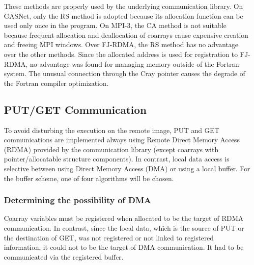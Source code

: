 These methods are properly used by the underlying communication library.
%
On GASNet, only the RS method is adopted because its allocation function
can be used only once in the program.
%
On MPI-3, the CA method is not suitable because frequent 
allocation and deallocation of coarrays cause expensive creation and freeing 
MPI windows.
%
Over FJ-RDMA, the RS method has no advantage over the other methods.
Since the allocated address is used for registration to FJ-RDMA, 
no advantage was found for managing memory outside of the Fortran system. 
The unusual connection through the Cray pointer causes the degrade of 
the Fortran compiler optimization.


\subsection{PUT/GET Communication}\label{sec:putget}

To avoid disturbing the execution on the remote image, PUT and GET communications
are implemented always using Remote Direct Memory Access (RDMA) provided by 
the communication library (except coarrays with pointer/allocatable structure components). 
In contrast, local data access is selective between using Direct Memory Access (DMA) or
using a local buffer. For the buffer scheme, one of four algorithms will be chosen.


\subsubsection{Determining the possibility of DMA}\label{sec:opt-dma}

Coarray variables must be registered when allocated to be 
the target of RDMA communication. In contrast, since the local
data, which is the source of PUT or the destination of GET,
was not registered or not linked to registered information,
it could not to be the target of DMA communication.
It had to be communicated via the registered buffer.

